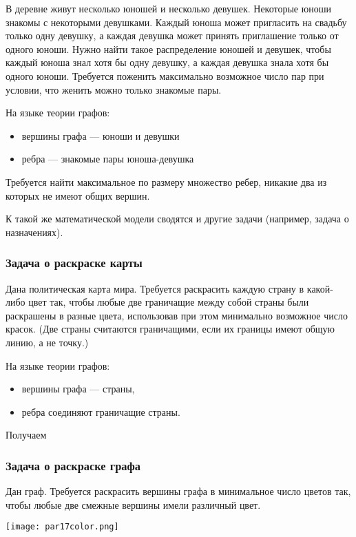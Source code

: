 В деревне живут несколько юношей и несколько девушек. Некоторые юноши знакомы с некоторыми девушками. Каждый юноша может пригласить на свадьбу только одну девушку, а каждая девушка может принять приглашение только от одного юноши. Нужно найти такое распределение юношей и девушек, чтобы каждый юноша знал хотя бы одну девушку, а каждая девушка знала хотя бы одного юноши. Требуется поженить максимально возможное число пар при условии, что женить можно только знакомые пары.

На языке теории графов:
\begin{itemize}
    \item вершины графа --- юноши и девушки
    \item ребра --- знакомые пары юноша-девушка
\end{itemize}

Требуется найти максимальное по размеру множество ребер, никакие два из которых не имеют общих вершин.

К такой же математической модели сводятся и другие задачи (например, задача о назначениях).

\subsubsection*{Задача о раскраске карты}

Дана политическая карта мира. Требуется раскрасить каждую страну в какой-либо цвет так, чтобы любые две граничащие между собой страны были раскрашены в разные цвета, использовав при этом минимально возможное число красок. (Две страны считаются граничащими, если их границы имеют общую линию, а не точку.)

На языке теории графов:
\begin{itemize}
    \item вершины графа --- страны,
    \item ребра соединяют граничащие страны.
\end{itemize}

Получаем

\subsubsection*{Задача о раскраске графа}

Дан граф. Требуется раскрасить вершины графа в минимальное число цветов так, чтобы любые две смежные вершины имели различный цвет.

\begin{center}
    \texttt{[image: par17color.png]}
\end{center}